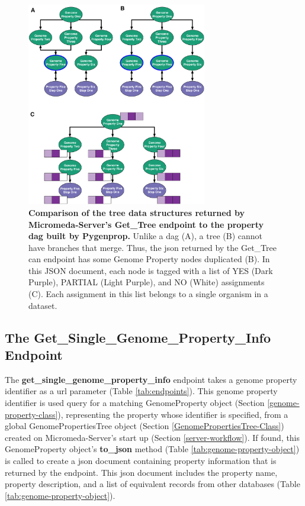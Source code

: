 \begin{figure}[!ht]
  \centering
	\includegraphics[width=0.70\textwidth]{media/Tree-JSON.pdf}
	 \caption[Comparison of the tree data structures returned by Micromeda-Server's 
Get\_Tree endpoint to the property DAG built by Pygenprop.]{\textbf{Comparison 
of the tree data structures returned by Micromeda-Server's Get\_Tree endpoint to 
the property \gls{dag} built by Pygenprop.} Unlike a \gls{dag} (A), a tree (B) 
cannot have branches that merge. Thus, the \gls{json} returned by the 
Get\_Tree can endpoint has some Genome Property nodes duplicated (B). In this 
JSON document, each node is tagged with a list of YES (Dark Purple), PARTIAL 
(Light Purple), and NO (White) assignments (C). Each assignment in this list 
belongs to a single organism in a dataset.}
	 \label{fig:tree-json}
\end{figure}

\subsection{The Get\_Single\_Genome\_Property\_Info Endpoint} 
\label{get-property-info-endpoint}

The \textbf{get\_single\_genome\_property\_info} endpoint takes a genome 
property identifier as a \gls{url} parameter (Table \ref{tab:endpoints}). This 
genome property identifier is used query for a matching GenomeProperty object 
(Section \ref{genome-property-class}), representing the property whose 
identifier is specified, from a global GenomePropertiesTree object (Section 
\ref{GenomePropertiesTree-Class}) created on Micromeda-Server's start up 
(Section \ref{server-workflow}). If found, this GenomeProperty object's 
\textbf{to\_json} method (Table \ref{tab:genome-property-object}) is called to 
create a \gls{json} document containing property information that is returned by 
the endpoint. This \gls{json} document includes the property name, property 
description, and a list of equivalent records from other databases (Table 
\ref{tab:genome-property-object}).

